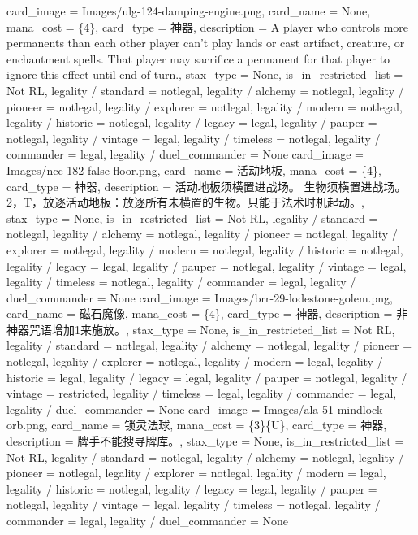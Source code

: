\documentclass[lang = cn, color = black, 10pt]{AllThatStax}
\begin{document}
\card
{
	card_image = Images/ulg-124-damping-engine.png,
	card_name = None,
	mana_cost = \{4\},
	card_type = 神器,
	description = A player who controls more permanents than each other player can't play lands or cast artifact, creature, or enchantment spells. That player may sacrifice a permanent for that player to ignore this effect until end of turn.,
	stax_type = None,
	is_in_restricted_list = Not RL,
	legality / standard = notlegal,
	legality / alchemy = notlegal,
	legality / pioneer = notlegal,
	legality / explorer = notlegal,
	legality / modern = notlegal,
	legality / historic = notlegal,
	legality / legacy = legal,
	legality / pauper = notlegal,
	legality / vintage = legal,
	legality / timeless = notlegal,
	legality / commander = legal,
	legality / duel_commander = None
}
\card
{
	card_image = Images/ncc-182-false-floor.png,
	card_name = 活动地板,
	mana_cost = \{4\},
	card_type = 神器,
	description = 活动地板须横置进战场。
	生物须横置进战场。
	{2}，{T}，放逐活动地板：放逐所有未横置的生物。只能于法术时机起动。,
	stax_type = None,
	is_in_restricted_list = Not RL,
	legality / standard = notlegal,
	legality / alchemy = notlegal,
	legality / pioneer = notlegal,
	legality / explorer = notlegal,
	legality / modern = notlegal,
	legality / historic = notlegal,
	legality / legacy = legal,
	legality / pauper = notlegal,
	legality / vintage = legal,
	legality / timeless = notlegal,
	legality / commander = legal,
	legality / duel_commander = None
}
\card
{
	card_image = Images/brr-29-lodestone-golem.png,
	card_name = 磁石魔像,
	mana_cost = \{4\},
	card_type = 神器,
	description = 非神器咒语增加{1}来施放。,
	stax_type = None,
	is_in_restricted_list = Not RL,
	legality / standard = notlegal,
	legality / alchemy = notlegal,
	legality / pioneer = notlegal,
	legality / explorer = notlegal,
	legality / modern = legal,
	legality / historic = legal,
	legality / legacy = legal,
	legality / pauper = notlegal,
	legality / vintage = restricted,
	legality / timeless = legal,
	legality / commander = legal,
	legality / duel_commander = None
}
\card
{
	card_image = Images/ala-51-mindlock-orb.png,
	card_name = 锁灵法球,
	mana_cost = \{3\}\{U\},
	card_type = 神器,
	description = 牌手不能搜寻牌库。,
	stax_type = None,
	is_in_restricted_list = Not RL,
	legality / standard = notlegal,
	legality / alchemy = notlegal,
	legality / pioneer = notlegal,
	legality / explorer = notlegal,
	legality / modern = legal,
	legality / historic = notlegal,
	legality / legacy = legal,
	legality / pauper = notlegal,
	legality / vintage = legal,
	legality / timeless = notlegal,
	legality / commander = legal,
	legality / duel_commander = None
}
\end{document}
